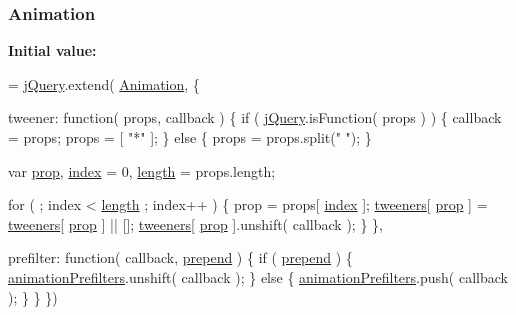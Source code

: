 \subsubsection[{Animation}]{ Animation}\label{packages_2j_query_81_810_82_2_content_2_scripts_2jquery-1_810_82_8js_a3299b781c8ec8287357326920ab3565a}
{\bfseries Initial value\+:}
\begin{DoxyCode}
= \hyperlink{_bibabook_2_scripts_2jquery-1_810_82_8js_a5e01048fbd3a30b44e8d491d8945c457}{jQuery}.extend( \hyperlink{_bibabook_2_scripts_2jquery-1_810_82_8js_a3299b781c8ec8287357326920ab3565a}{Animation}, \{

    tweener: \textcolor{keyword}{function}( props, callback ) \{
        \textcolor{keywordflow}{if} ( \hyperlink{_bibabook_2_scripts_2jquery-1_810_82_8js_a5e01048fbd3a30b44e8d491d8945c457}{jQuery}.isFunction( props ) ) \{
            callback = props;
            props = [ \textcolor{stringliteral}{"*"} ];
        \} \textcolor{keywordflow}{else} \{
            props = props.split(\textcolor{stringliteral}{" "});
        \}

        var \hyperlink{jquery-1_810_82-vsdoc_8js_af17be84954030af6c2286f5da385d41b}{prop},
            \hyperlink{jquery-1_810_82-vsdoc_8js_a75bb12d1f23302a9eea93a6d89d0193e}{index} = 0,
            \hyperlink{jquery-1_810_82-vsdoc_8js_aa7de35d58da66d9944ab9cbe82c19640}{length} = props.length;

        \textcolor{keywordflow}{for} ( ; index < \hyperlink{jquery-1_810_82-vsdoc_8js_aa7de35d58da66d9944ab9cbe82c19640}{length} ; index++ ) \{
            prop = props[ \hyperlink{jquery-1_810_82-vsdoc_8js_a75bb12d1f23302a9eea93a6d89d0193e}{index} ];
            \hyperlink{_bibabook_2_scripts_2jquery-1_810_82_8js_a948afd2431eec272c99689edddfb6850}{tweeners}[ \hyperlink{jquery-1_810_82-vsdoc_8js_af17be84954030af6c2286f5da385d41b}{prop} ] = \hyperlink{_bibabook_2_scripts_2jquery-1_810_82_8js_a948afd2431eec272c99689edddfb6850}{tweeners}[ \hyperlink{jquery-1_810_82-vsdoc_8js_af17be84954030af6c2286f5da385d41b}{prop} ] || [];
            \hyperlink{_bibabook_2_scripts_2jquery-1_810_82_8js_a948afd2431eec272c99689edddfb6850}{tweeners}[ \hyperlink{jquery-1_810_82-vsdoc_8js_af17be84954030af6c2286f5da385d41b}{prop} ].unshift( callback );
        \}
    \},

    prefilter: \textcolor{keyword}{function}( callback, \hyperlink{jquery-1_810_82-vsdoc_8js_a2d1a98145e139b1aea1d95967466b151}{prepend} ) \{
        \textcolor{keywordflow}{if} ( \hyperlink{jquery-1_810_82-vsdoc_8js_a2d1a98145e139b1aea1d95967466b151}{prepend} ) \{
            \hyperlink{_bibabook_2_scripts_2jquery-1_810_82_8js_adb3f17c5359fbc12b7043b6969553d78}{animationPrefilters}.unshift( callback );
        \} \textcolor{keywordflow}{else} \{
            \hyperlink{_bibabook_2_scripts_2jquery-1_810_82_8js_adb3f17c5359fbc12b7043b6969553d78}{animationPrefilters}.push( callback );
        \}
    \}
\})
\end{DoxyCode}
